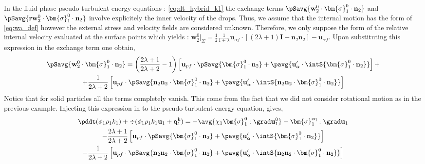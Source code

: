 In the fluid phase pseudo turbulent energy equations : \ref{eq:dt_hybrid_k1} the exchange terms $\pSavg{\textbf{w}_2^0 \cdot \bm{\sigma}_1^0\cdot\textbf{n}_2}$ and  $\pSavg{\textbf{rw}_2^0 \cdot \bm{\sigma}_1^0\cdot\textbf{n}_2}$ involve explicitely the inner velocity of the drops.
Thus, we assume that the internal motion has the form of \ref{eq:wa_def} however the external stress and velocity fields are considered unknown.
Therefore, we only suppose the form of the relative internal velocity evaluated at the surface points which yields : $\textbf{w}_2^0|_\Sigma =
\frac{1}{2}\frac{1}{1+\lambda} \textbf{u}_{\alpha f}\cdot \left[
    (2\lambda+1)\textbf{I}
    + \textbf{n}_2\textbf{n}_2
\right] - \textbf{u}_{\alpha f}$. 
Upon substituting this expression in the exchange term one obtain,
\begin{multline*}
    \pSavg{\textbf{w}_2^0 \cdot \bm{\sigma}_1^0\cdot\textbf{n}_2}
    =  
    \left(\frac{2\lambda + 1}{2\lambda+2} - 1\right)\left[
        \textbf{u}_{p f}\cdot\pSavg{ \bm{\sigma}_1^0\cdot\textbf{n}_2}
        + \pavg{\textbf{u}_{\alpha}' \cdot \intS{ \bm{\sigma}_1^0\cdot\textbf{n}_2} }
    \right]
    + \\
    + \frac{1}{2\lambda+2}\left[
        \textbf{u}_{p f} \cdot\pSavg{\textbf{n}_2\textbf{n}_2\cdot \bm{\sigma}_1^0\cdot\textbf{n}_2}
        +
        \pavg{\textbf{u}_{\alpha}' \cdot \intS{\textbf{n}_2\textbf{n}_2\cdot \bm{\sigma}_1^0\cdot\textbf{n}_2}}
    \right]
\end{multline*}
Notice that for solid particles all the terms completely vanish.
This come from the fact that we did not consider rotational motion as in the previous example. 
Injecting this expression in to the pseudo turbulent energy equation, gives,
\begin{multline}
    \label{eq:dt_hybrid_k1_new}
    \pddt (\phi_1\rho_1k_1)  
    + \div (
        \phi_1\rho_1k_1\textbf{u}_1
        + \textbf{q}_1^\text{k} 
        )
    = 
    - \avg{\chi_1\bm{\sigma}_1^0 : \grad \textbf{u}_1^0}
    - \bm{\sigma}_1^\text{eq} : \grad \textbf{u}_1\\
    - \frac{2\lambda +1}{2\lambda +2} 
    \left[
        \textbf{u}_{pf}
        \cdot \pSavg{\bm{\sigma}_1^0 \cdot \textbf{n}_2}
        + \pavg{ \textbf{u}_\alpha' \cdot \intS{  \bm{\sigma}_1^0 \cdot \textbf{n}_2}}
    \right]\\
    - \frac{1}{2\lambda+2}\left[
        \textbf{u}_{p f} \cdot\pSavg{\textbf{n}_2\textbf{n}_2\cdot \bm{\sigma}_1^0\cdot\textbf{n}_2}
        +
        \pavg{\textbf{u}_{\alpha}' \cdot \intS{\textbf{n}_2\textbf{n}_2\cdot \bm{\sigma}_1^0\cdot\textbf{n}_2}}
    \right]
\end{multline}
